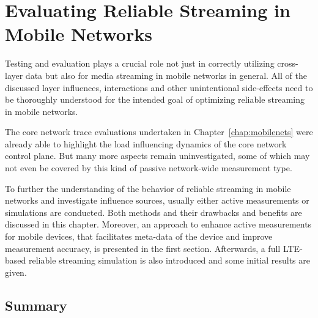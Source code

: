 \chapter{Evaluating Reliable Streaming in Mobile Networks}
\label{chap:mobilestreaming-measurements}

Testing and evaluation plays a crucial role not just in correctly utilizing cross-layer data but also for media streaming in mobile networks in general. All of the discussed layer influences, interactions and other unintentional side-effects need to be thoroughly understood for the intended goal of optimizing reliable streaming in mobile networks.

The core network trace evaluations undertaken in Chapter~\ref{chap:mobilenets} were already able to highlight the load influencing dynamics of the core network control plane. But many more aspects remain uninvestigated, some of which may not even be covered by this kind of passive network-wide measurement type.

To further the understanding of the behavior of reliable streaming in mobile networks and investigate influence sources, usually either active measurements or simulations are conducted. Both methods and their drawbacks and benefits are discussed in this chapter. Moreover, an approach to enhance active measurements for mobile devices, that facilitates meta-data of the device and improve measurement accuracy, is presented in the first section. Afterwards, a full \gls{LTE}-based reliable streaming simulation is also introduced and some initial results are given.







\section{Summary}










